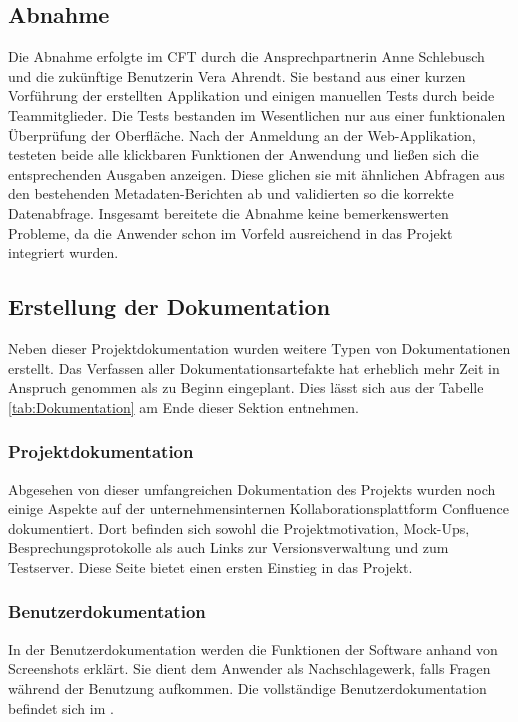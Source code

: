 \subsection{Abnahme}
\label{sec:Abnahme}
Die Abnahme erfolgte im \ac{CFT} \teamName durch die Ansprechpartnerin Anne Schlebusch und die zukünftige Benutzerin Vera Ahrendt. Sie bestand aus einer kurzen Vorführung der erstellten Applikation und einigen manuellen Tests durch beide Teammitglieder. Die Tests bestanden im Wesentlichen nur aus einer funktionalen Überprüfung der Oberfläche. Nach der Anmeldung an der Web-Applikation, testeten beide alle klickbaren Funktionen der Anwendung und ließen sich die entsprechenden Ausgaben anzeigen. Diese glichen sie mit ähnlichen Abfragen aus den bestehenden Metadaten-Berichten ab und validierten so die korrekte Datenabfrage. Insgesamt bereitete die Abnahme keine bemerkenswerten Probleme, da die Anwender schon im Vorfeld ausreichend in das Projekt integriert wurden.

\subsection{Erstellung der Dokumentation}
\label{sec:Dokumentation}
Neben dieser Projektdokumentation wurden weitere Typen von Dokumentationen erstellt. Das Verfassen aller Dokumentationsartefakte hat erheblich mehr Zeit in Anspruch genommen als zu Beginn eingeplant. Dies lässt sich aus der Tabelle \ref{tab:Dokumentation} am Ende dieser Sektion entnehmen.

\subsubsection{Projektdokumentation}
\label{sec:Projektdokumentation}
Abgesehen von dieser umfangreichen Dokumentation des Projekts wurden noch einige Aspekte auf der unternehmensinternen Kollaborationsplattform Confluence dokumentiert. Dort befinden sich sowohl die Projektmotivation, Mock-Ups, Besprechungsprotokolle als auch Links zur Versionsverwaltung und zum Testserver. Diese Seite bietet einen ersten Einstieg in das Projekt.

\subsubsection{Benutzerdokumentation}
\label{sec:Benutzerdokumentation}
In der Benutzerdokumentation werden die Funktionen der Software anhand von Screenshots erklärt. Sie dient dem Anwender als Nachschlagewerk, falls Fragen während der Benutzung aufkommen. Die vollständige Benutzerdokumentation befindet sich im .

